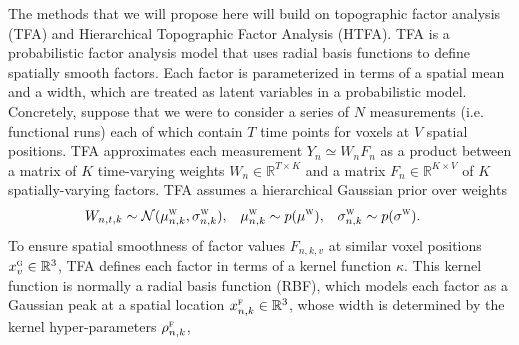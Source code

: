 \documentclass{article}
\newcommand{\scf}{\textsc{f}}
\newcommand{\scg}{\textsc{g}}
\newcommand{\scw}{\textsc{w}}
\begin{document}

The methods that we will propose here will build on topographic factor analysis (TFA) \cite{manning2014topographic} and Hierarchical Topographic Factor Analysis \cite{htfa} (HTFA). %
TFA is a probabilistic factor analysis model that uses radial basis functions to define spatially smooth factors. Each factor is parameterized in terms of a spatial mean and a width, which are treated as latent variables in a probabilistic model. 
Concretely, suppose that we were to consider a series of $N$ measurements (i.e. functional runs) each of which contain $T$ time points for voxels at $V$ spatial positions. TFA approximates each measurement $Y_{n} \simeq W_{n} F_{n}$ as a product between a matrix of $K$ time-varying weights $W_n \in \mathbb{R}^{T \times K}$ and a matrix $F_n \in \mathbb{R}^{K \times V}$ of $K$ spatially-varying factors. TFA assumes a hierarchical Gaussian prior over weights
\begin{align*}
	W_{n,t,k}
    &\sim 
    \mathcal{N}(\mu^\scw_{n,k}, \sigma^\scw_{n,k}),
    &
	\mu^\scw_{n,k}
   	&\sim 
    p(\mu^\scw),
    &
	\sigma^\scw_{n,k} 
   	&\sim 
    p(\sigma^\scw).
\end{align*}
To ensure spatial smoothness of factor values $F_{n,k,v}$ at similar voxel positions $x^\scg_v \in \mathbb{R}^3$, TFA defines each factor in terms of a kernel function $\kappa$. This kernel function is normally a radial basis function (RBF), which models each factor as a Gaussian peak at a spatial location $x_{n,k}^\scf \in \mathbb{R}^3$, whose width is determined by the kernel hyper-parameters $\rho^\scf_{n,k}$, 
\end{document}
